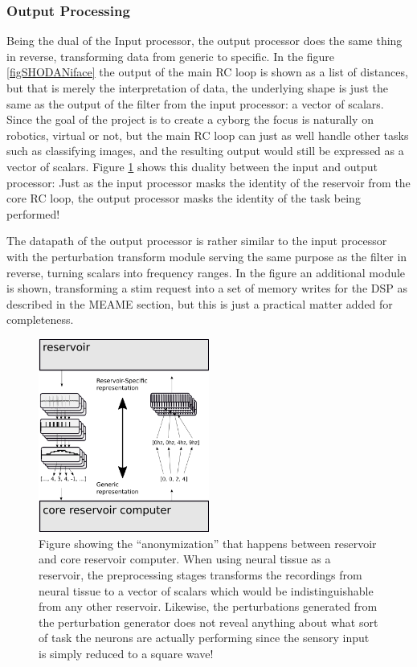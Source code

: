 \subsubsection{Output Processing}
Being the dual of the Input processor, the output processor does the same thing
in reverse, transforming data from generic to specific.
In the figure \ref{figSHODANiface} the output of the main RC loop is shown as a
list of distances, but that is merely the interpretation of data, the underlying
shape is just the same as the output of the filter from the input processor: a
vector of scalars.
Since the goal of the project is to create a cyborg the focus is naturally on
robotics, virtual or not, but the main RC loop can just as well handle other
tasks such as classifying images, and the resulting output would still be
expressed as a vector of scalars.
Figure \ref{figGenericSpecific} shows this duality between the input and output
processor: Just as the input processor masks the identity of the reservoir from
the core RC loop, the output processor masks the identity of the task being
performed!\par
The datapath of the output processor is rather similar to the input processor
with the perturbation transform module serving the same purpose as the filter in
reverse, turning scalars into frequency ranges.
In the figure an additional module is shown, transforming a stim request into a
set of memory writes for the DSP as described in the MEAME section, but this is
just a practical matter added for completeness.
\begin{figure}[h!]
  \centering
  \includegraphics[width=0.5\textwidth]{fig/genericSpecific.png}
  \caption{
    Figure showing the ``anonymization'' that happens between reservoir and core
    reservoir computer.
    When using neural tissue as a reservoir, the preprocessing stages transforms
    the recordings from neural tissue to a vector of scalars which would be
    indistinguishable from any other reservoir.
    Likewise, the perturbations generated from the perturbation generator does
    not reveal anything about what sort of task the neurons are actually
    performing since the sensory input is simply reduced to a square wave!
  }
  \label{figGenericSpecific}
\end{figure}
